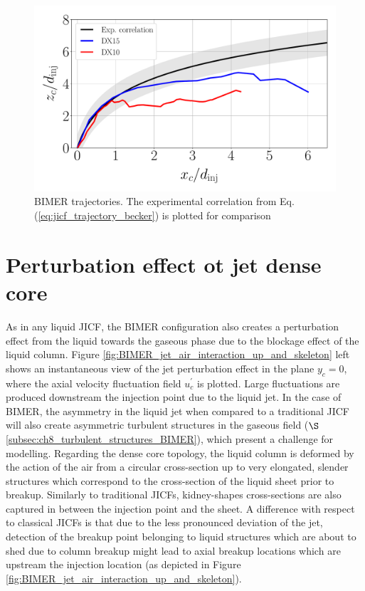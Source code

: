 \begin{figure}[ht]
\centering
   \includegraphics[scale=0.3]{./part3_applications/figures_ch8_resolved/trajectories_BIMER}
   \caption[BIMER trajectories]{BIMER trajectories. The experimental correlation from Eq. (\ref{eq:jicf_trajectory_becker})  is plotted for comparison}
\label{fig:BIMER_trajectories}
\end{figure}


\section{Perturbation effect ot jet dense core}
\label{ch8:sec_BIMER_DC_characterization}

As in any liquid JICF, the BIMER configuration also creates a perturbation effect from the liquid towards the gaseous phase due to the blockage effect of the liquid column. Figure \ref{fig:BIMER_jet_air_interaction_up_and_skeleton} left shows an instantaneous view of the jet perturbation effect in the plane $y_c = 0$, where the axial velocity fluctuation field $u^\prime_c$ is plotted. Large fluctuations are produced downstream the injection point due to the liquid jet. In the case of BIMER, the asymmetry in the liquid jet when compared to a traditional JICF will also create asymmetric turbulent structures in the gaseous field ($\S$\ref{subsec:ch8_turbulent_structures_BIMER}), which present a challenge for modelling. Regarding the dense core topology, the liquid column is deformed by the action of the air from a circular cross-section up to very elongated, slender structures which correspond to the cross-section of the liquid sheet prior to breakup. Similarly to traditional JICFs, kidney-shapes cross-sections are also captured in between the injection point and the sheet. A difference with respect to classical JICFs is that due to the less pronounced deviation of the jet, detection of the breakup point belonging to liquid structures which are about to shed due to column breakup might lead to axial breakup locations which are upstream the injection location (as depicted in Figure \ref{fig:BIMER_jet_air_interaction_up_and_skeleton}).



